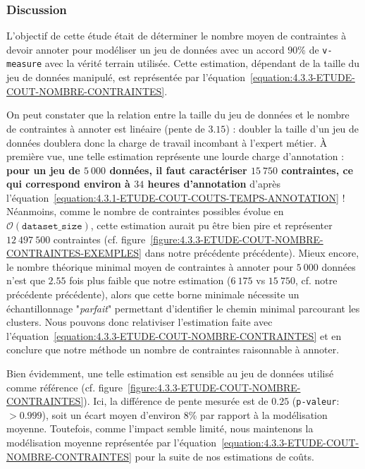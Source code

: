 		\subsubsection{Discussion}
		
			L'objectif de cette étude était de déterminer le nombre moyen de contraintes à devoir annoter pour modéliser un jeu de données avec un accord $90$\% de \texttt{v-measure} avec la vérité terrain utilisée.
			Cette estimation, dépendant de la taille du jeu de données manipulé, est représentée par l'équation~\ref{equation:4.3.3-ETUDE-COUT-NOMBRE-CONTRAINTES}.
			
			On peut constater que la relation entre la taille du jeu de données et le nombre de contraintes à annoter est linéaire (pente de $3.15$) : doubler la taille d'un jeu de données doublera donc la charge de travail incombant à l'expert métier.
			À première vue, une telle estimation représente une lourde charge d'annotation : \textbf{pour un jeu de $5~000$ données, il faut caractériser $15~750$ contraintes, ce qui correspond environ à $34$ heures d'annotation} d'après l'équation~\ref{equation:4.3.1-ETUDE-COUT-COUTS-TEMPS-ANNOTATION} !
			Néanmoins, comme le nombre de contraintes possibles évolue en $ \mathcal{O}(\texttt{dataset\_size}) $, cette estimation aurait pu être bien pire et représenter $12~497~500$ contraintes (cf. figure~\ref{figure:4.3.3-ETUDE-COUT-NOMBRE-CONTRAINTES-EXEMPLES} dans notre précédente précédente).
			Mieux encore, le nombre théorique minimal moyen de contraintes à annoter pour $5~000$ données n'est que $2.55$ fois plus faible que notre estimation ($6~175$ vs $15~750$, cf. notre précédente précédente), alors que cette borne minimale nécessite un échantillonnage "\textit{parfait}" permettant d'identifier le chemin minimal parcourant les clusters.
			Nous pouvons donc relativiser l'estimation faite avec l'équation~\ref{equation:4.3.3-ETUDE-COUT-NOMBRE-CONTRAINTES} et en conclure que notre méthode un nombre de contraintes raisonnable à annoter.
			
			Bien évidemment, une telle estimation est sensible au jeu de données utilisé comme référence (cf. figure~\ref{figure:4.3.3-ETUDE-COUT-NOMBRE-CONTRAINTES}).
			Ici, la différence de pente mesurée est de $0.25$ (\texttt{p-valeur}: $> 0.999$), soit un écart moyen d'environ $8$\% par rapport à la modélisation moyenne.
			Toutefois, comme l'impact semble limité, nous maintenons la modélisation moyenne représentée par l'équation~\ref{equation:4.3.3-ETUDE-COUT-NOMBRE-CONTRAINTES} pour la suite de nos estimations de coûts.
		
